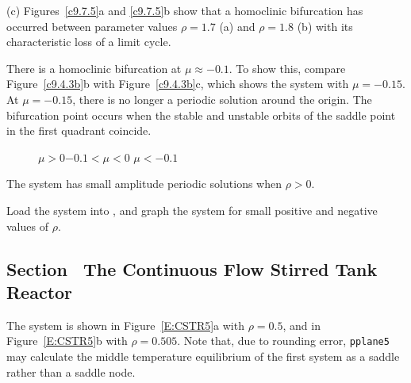 (c)  Figures~\ref{c9.7.5}a and \ref{c9.7.5}b show that a homoclinic 
bifurcation has occurred between parameter values $\rho=1.7$ (a) and 
$\rho=1.8$ (b) with its characteristic loss of a limit cycle. 

\begin{figure}[htb]
                       \centerline{%
                       }
\end{figure}

There is a homoclinic bifurcation at $\mu \approx -0.1$.  To show this,
compare Figure~\ref{c9.4.3b}b with Figure~\ref{c9.4.3b}c, which shows the
system with $\mu = -0.15$.  At $\mu = -0.15$, there is no longer a periodic
solution around the origin.  The bifurcation point occurs when the stable
and unstable orbits of the saddle point in the first quadrant coincide.

\begin{figure}[htb]
                       \centerline{%
                       }
		\centerline{$\mu > 0$\hspace{1.2in}$-0.1 < \mu < 0$
\hspace{1.2in}$\mu < -0.1$}
\end{figure}

\ans The system has small amplitude periodic solutions when $\rho > 0$.

\soln Load the system into \Matlab, and graph the
system for small positive and negative values of $\rho$.



\subsection*{Section~\protect{\ref{S:CSTR}} The Continuous Flow Stirred Tank
Reactor}

The system is shown in Figure~\ref{E:CSTR5}a with $\rho = 0.5$, and in
Figure~\ref{E:CSTR5}b with $\rho = 0.505$.  Note that, due to rounding
error, {\tt pplane5} may calculate the middle temperature equilibrium of
the first system as a saddle rather than a saddle node.  

